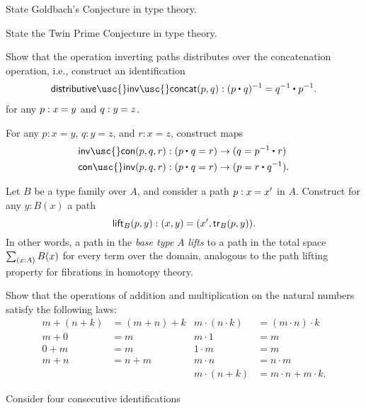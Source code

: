 \begin{exercises}
\item
  \begin{subexenum}
  \item State Goldbach's Conjecture in type theory.
  \item State the Twin Prime Conjecture in type theory.
  \end{subexenum}
\item \label{ex:inv_assoc}Show that the operation inverting paths distributes over the concatenation operation, i.e., construct an identification
  \begin{align*}
    \mathsf{distributive\usc{}inv\usc{}concat}(p,q):\id{(\ct{p}{q})^{-1}}{\ct{q^{-1}}{p^{-1}}}.
  \end{align*}
  for any $p:\id{x}{y}$ and $q:\id{y}{z}$.
\item \label{ex:inv_con}For any $p:x=y$, $q:y=z$, and $r:x=z$, construct maps
  \begin{align*}
    \mathsf{inv\usc{}con}(p,q,r) & : (\ct{p}{q}=r)\to (q=\ct{p^{-1}}{r}) \\
    \mathsf{con\usc{}inv}(p,q,r) & : (\ct{p}{q}=r)\to (p=\ct{r}{q^{-1}}).
  \end{align*}
\item Let $B$ be a type family over $A$, and consider a path $p:\id{x}{x'}$ in $A$. Construct for any $y:B(x)$ a path
  \begin{equation*}
    \mathsf{lift}_B(p,y) : \id{\pairr{x,y}}{\pairr{x',\mathsf{tr}_B(p,y)}}.
  \end{equation*}
  In other words, a path in the \emph{base type} $A$ \emph{lifts} to a path in the total space $\sm{x:A}B(x)$ for every term over the domain, analogous to the path lifting property for fibrations in homotopy theory.
\item \label{ex:semi-ring-laws-N}Show that the operations of addition and multiplication on the natural numbers satisfy the following laws:
  \begin{align*}
    m+(n+k) & =(m+n)+k & m\cdot (n\cdot k) & = (m\cdot n)\cdot k \\
    m+0 & = m & m\cdot 1 & = m \\
    0+m & = m & 1\cdot m & = m \\
    m+n & = n+m & m\cdot n & = n\cdot m\\
    & & m\cdot (n+k) & = m\cdot n + m\cdot k.
  \end{align*}
\item Consider four consecutive identifications
  \begin{equation*}

\end{equation*}
\end{exercises}
